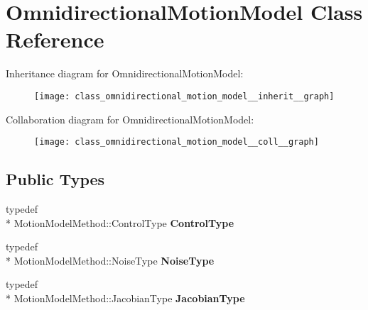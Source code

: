 \hypertarget{class_omnidirectional_motion_model}{\section{Omnidirectional\-Motion\-Model Class Reference}
\label{class_omnidirectional_motion_model}
}


Inheritance diagram for Omnidirectional\-Motion\-Model\-:\nopagebreak
\begin{figure}[H]
\begin{center}
\leavevmode
\texttt{[image: class\_omnidirectional\_motion\_model\_\_inherit\_\_graph]}
\end{center}
\end{figure}


Collaboration diagram for Omnidirectional\-Motion\-Model\-:\nopagebreak
\begin{figure}[H]
\begin{center}
\leavevmode
\texttt{[image: class\_omnidirectional\_motion\_model\_\_coll\_\_graph]}
\end{center}
\end{figure}
\subsection*{Public Types}
\begin{DoxyCompactItemize}
\item 
\hypertarget{class_omnidirectional_motion_model_ab761aa52908fa754b51eff29f4c43ffb}{typedef \\*
Motion\-Model\-Method\-::\-Control\-Type {\bfseries Control\-Type}}\label{class_omnidirectional_motion_model_ab761aa52908fa754b51eff29f4c43ffb}

\item 
\hypertarget{class_omnidirectional_motion_model_acd1bed3134e9fc446d2f6ce1433926ac}{typedef \\*
Motion\-Model\-Method\-::\-Noise\-Type {\bfseries Noise\-Type}}\label{class_omnidirectional_motion_model_acd1bed3134e9fc446d2f6ce1433926ac}

\item 
\hypertarget{class_omnidirectional_motion_model_a96d8331573f4d0f8db182c1df8507816}{typedef \\*
Motion\-Model\-Method\-::\-Jacobian\-Type {\bfseries Jacobian\-Type}}\label{class_omnidirectional_motion_model_a96d8331573f4d0f8db182c1df8507816}

\end{DoxyCompactItemize}
